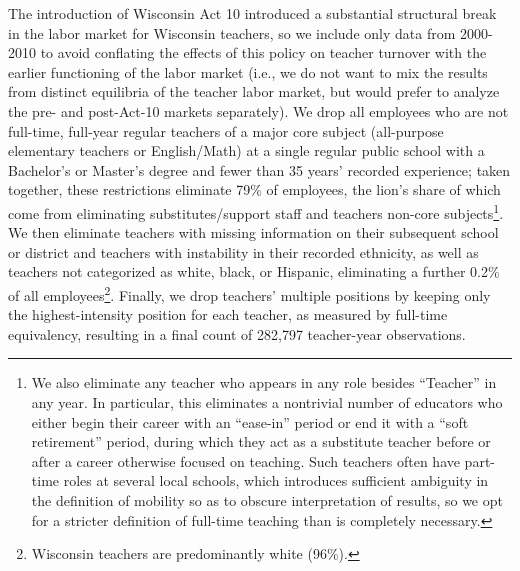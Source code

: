\documentclass[12pt,]{article}
\let\rmarkdownfootnote\footnote%
\def\footnote{\protect\rmarkdownfootnote}
\begin{document}
The introduction of Wisconsin Act 10 introduced a substantial structural
break in the labor market for Wisconsin teachers, so we include only
data from 2000-2010 to avoid conflating the effects of this policy on
teacher turnover with the earlier functioning of the labor market (i.e.,
we do not want to mix the results from distinct equilibria of the
teacher labor market, but would prefer to analyze the pre- and
post-Act-10 markets separately). We drop all employees who are not
full-time, full-year regular teachers of a major core subject
(all-purpose elementary teachers or English/Math) at a single regular
public school with a Bachelor's or Master's degree and fewer than 35
years' recorded experience; taken together, these restrictions eliminate
79\% of employees, the lion's share of which come from eliminating
substitutes/support staff and teachers non-core subjects\footnote{We
  also eliminate any teacher who appears in any role besides ``Teacher''
  in any year. In particular, this eliminates a nontrivial number of
  educators who either begin their career with an ``ease-in'' period or
  end it with a ``soft retirement'' period, during which they act as a
  substitute teacher before or after a career otherwise focused on
  teaching. Such teachers often have part-time roles at several local
  schools, which introduces sufficient ambiguity in the definition of
  mobility so as to obscure interpretation of results, so we opt for a
  stricter definition of full-time teaching than is completely
  necessary.}. We then eliminate teachers with missing information on
their subsequent school or district and teachers with instability in
their recorded ethnicity, as well as teachers not categorized as white,
black, or Hispanic, eliminating a further 0.2\% of all
employees\footnote{Wisconsin teachers are predominantly white (96\%).}.
Finally, we drop teachers' multiple positions by keeping only the
highest-intensity position for each teacher, as measured by full-time
equivalency, resulting in a final count of 282,797 teacher-year
observations.
\end{document}
